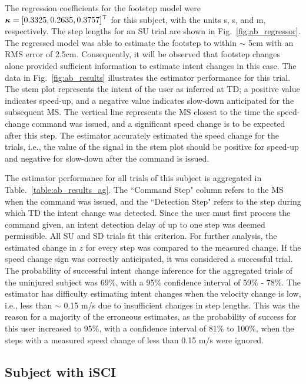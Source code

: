 The regression coefficients for the footstep model were $ \boldsymbol{\kappa} = [0.3325 ,0.2635 ,0.3757]^{\top} $ for this subject, with the units s, s, and m, respectively. The step lengths for an SU trial are shown in Fig.~\ref{fig:ab_regressor}. The regressed model was able to estimate the footstep to within $ \sim $ 5cm with an RMS error of 2.5cm. Consequently, it will be observed that footstep changes alone provided sufficient information to estimate intent changes in this case. The data in Fig.~\ref{fig:ab_results} illustrates the estimator performance for this trial. The stem plot represents the intent of the user as inferred at TD; a positive value indicates speed-up, and a negative value indicates slow-down anticipated for the subsequent MS. The vertical line represents the MS closest to the time the speed-change command was issued, and a significant speed change is to be expected after this step. The estimator accurately estimated the speed change for the trials, i.e., the value of the signal in the stem plot should be positive for speed-up and negative for slow-down after the command is issued.

The estimator performance for all trials of this subject is aggregated in Table.~\ref{table:ab_results_ag}. The ``Command Step" column refers to the MS when the command was issued, and the ``Detection Step" refers to the step during which TD the intent change was detected. Since the user must first process the command given, an intent detection delay of up to one step was deemed permissible. All SU and SD trials fit this criterion. 
%
%
%		
For further analysis, the estimated change in $ z $ for every step was compared to the measured change. If the speed change sign was correctly anticipated, it was considered a successful trial. The probability of successful intent change inference for the aggregated trials of the uninjured subject was 69\%, with a 95\% confidence interval \cite{brown2001interval} of 59\% - 78\%. The estimator has difficulty estimating intent changes when the velocity change is low, i.e., less than $ \sim $ 0.15 m/s due to insufficient changes in step lengths. This was the reason for a majority of the erroneous estimates, as the probability of success for this user increased to 95\%, with a confidence interval of 81\% to 100\%, when the steps with a measured speed change of less than 0.15 m/s were ignored.


\subsection{Subject with iSCI}\label{sec:nab_results}

